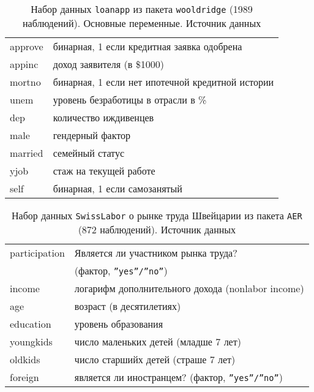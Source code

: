 \documentclass[12pt]{article}
\theoremstyle{remark}
\begin{document}
\begin{table}
	\caption{Набор данных \texttt{loanapp} из пакета \texttt{wooldridge} (1989  наблюдений). 
	Основные переменные. Источник данных \cite{loanapp}}
	\label{loanapp}
	\begin{tabular}{l|l}\hline
	approve & бинарная, 1 если кредитная заявка одобрена \\
	appinc & доход заявителя  (в \$1000) \\
	mortno & бинарная, 1 если нет ипотечной кредитной истории \\
	unem  & уровень безработицы в отрасли в \% \\
	dep & количество иждивенцев \\
	male & гендерный фактор \\
	married & семейный статус \\
	yjob & стаж на текущей работе \\
	self & бинарная, 1 если самозанятый \\
	\hline
	\end{tabular}
\end{table}

\begin{table}
	\caption{Набор данных \texttt{SwissLabor} о рынке труда Швейцарии
	из пакета \texttt{AER} (872  наблюдений). 
	Источник данных \cite{SwissLabor}}
	\label{SwissLabor}
	\begin{tabular}{l|l}\hline
	participation & Является ли участником рынка труда? \\
	& (фактор, \texttt{''yes''/''no''}) \\
	income & логарифм дополнительного дохода (nonlabor income) \\
	age & возраст (в десятилетиях) \\
	education  & уровень образования \\
	youngkids & число маленьких детей (младше 7 лет)\\
	oldkids & число старшийх детей (страше 7 лет) \\
	foreign & является ли иностранцем?  (фактор, \texttt{''yes''/''no''}) \\
	\hline
	\end{tabular}
\end{table}
\end{document}
